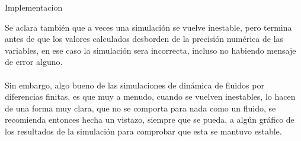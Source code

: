 \begin{section}{Implementacion}
\begin{itemize}
Se aclara también que a veces una simulación se vuelve inestable, pero termina antes de que los valores calculados desborden de la precisión numérica de las variables, en ese caso la simulación sera incorrecta, incluso no habiendo mensaje de error alguno. 
~\\
~\\
Sin embargo, algo bueno de las simulaciones de dinámica de fluidos por diferencias finitas, es que muy a menudo, cuando se vuelven inestables, lo hacen de una forma muy clara, que no se comporta para nada como un fluido, se recomienda entonces hecha un vistazo, siempre que se pueda, a algún gráfico de los resultados de la simulación para comprobar que esta se mantuvo estable.
\end{itemize}

\end{section}


